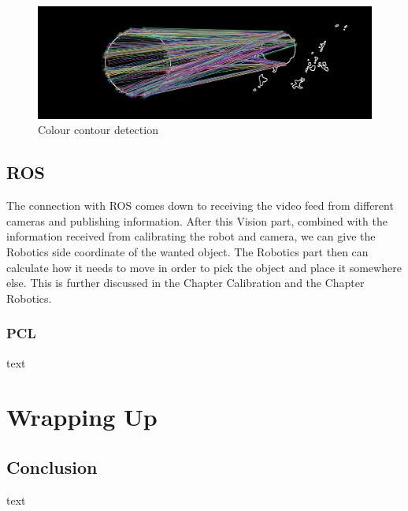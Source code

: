 \documentclass{report}
\begin{document}
\begin{figure}[h!]
\center
\includegraphics[width=1.0\textwidth]{../images/colourContourFeature_sphere.png}
\caption[]{Colour contour detection}
\label{fig:colourContourFeatureSphere}
\end{figure}

\section{ROS}
The connection with ROS comes down to receiving the video feed from different cameras and publishing information. After this Vision part, combined with the information received from calibrating the robot and camera, we can give the Robotics side coordinate of the wanted object. The Robotics part then can calculate how it needs to move in order to pick the object and place it somewhere else. This is further discussed in the Chapter Calibration and the Chapter Robotics.

\subsection{PCL}
text

\chapter{Wrapping Up}
\section{Conclusion}
text

\printbibliography
{}
\end{document}
